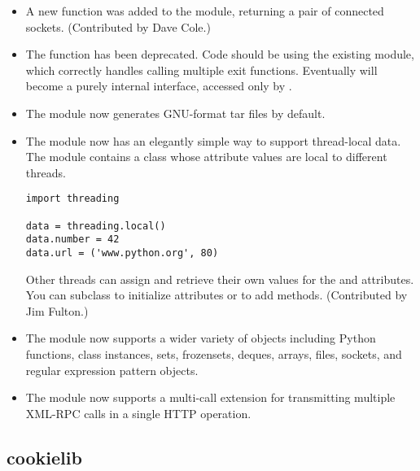\documentclass{howto}
\begin{document}
\begin{itemize}
\item A new  function was added to the
 module, returning a pair of connected sockets. 
(Contributed by Dave Cole.)


\item The  function has been deprecated.  Code
should be using the existing  module, which correctly
handles calling multiple exit functions.  Eventually
 will become a purely internal interface,
accessed only by .

\item The  module now generates GNU-format tar files
by default.

\item The  module now has an elegantly simple way to support 
thread-local data.  The module contains a  class whose
attribute values are local to different threads.

\begin{verbatim}
import threading

data = threading.local()
data.number = 42
data.url = ('www.python.org', 80)
\end{verbatim}

Other threads can assign and retrieve their own values for the
 and  attributes.  You can subclass
 to initialize attributes or to add methods.
(Contributed by Jim Fulton.)

\item The  module now supports a wider variety of objects
   including Python functions, class instances, sets, frozensets, deques,
   arrays, files, sockets, and regular expression pattern objects.

\item The  module now supports a multi-call extension for 
transmitting multiple XML-RPC calls in a single HTTP operation.
   
\end{itemize}



\subsection{cookielib}
\end{document}

